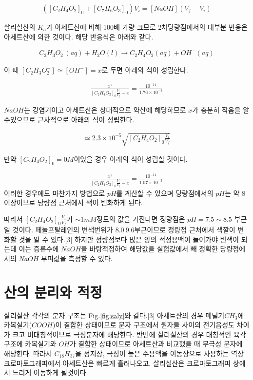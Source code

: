 \documentclass[%
 reprint,
 amsmath,amssymb,
 aps,
]{revtex4-2}
\begin{document}
\begin{align}
	([C_{2}H_{4}O_{2}]_{0}+[C_{7}H_{6}O_{3}]_{0})V_{i} = [NaOH](V_{f}-V_{i})
\end{align}

살리실산의 $K_{a}$가 아세트산에 비해 100배 가량 크므로 2차당량점에서의 대부분 반응은 아세트산에 의한 것이다. 해당 반응식은 아래와 같다.

\begin{align}
	C_{2}H_{3}O_{2}^{-}(aq) + H_{2}O(l) \rightarrow C_{2}H_{4}O_{2}(aq)+ OH^{-}(aq)
\end{align}

이 때 $[C_{2}H_{3}O_{2}^{-}] \simeq [OH^{-}] = x$로 두면 아래의 식이 성립한다.

\begin{align}
	\frac{x^{2}}{[C_{2}H_{4}O_{2}]_{0}\frac{V_{i}}{V_{f}}-x} = \frac{10^{-14}}{1.76\times10^{-5}}
\end{align}

$NaOH$는 강염기이고 아세트산은 상대적으로 약산에 해당하므로 $x$가 충분히 작음을 알수있으므로 근사적으로 아래의 식이 성립한다.

\begin{align}
	[OH^{-}] \simeq 2.3\times10^{-5}\sqrt{[C_{2}H_{4}O_{2}]_{0}\frac{V_{i}}{V_{f}}}
\end{align}

만약 $[C_{2}H_{4}O_{2}]_{0} = 0M$이었을 경우 아래의 식이 성립할 것이다.

\begin{align}
	\frac{x^{2}}{[C_{2}H_{4}O_{2}]_{0}\frac{V_{i}}{V_{f}}-x} = \frac{10^{-14}}{1.07\times10^{-3}}
\end{align}
이러한 경우에도 마찬가지 방법으로 $pH$를 계산할 수 있으며 당량점에서의 $pH$는 약 $8$이상이므로 당량점 근처에서 색이 변화하게 된다.

따라서 $[C_{2}H_{4}O_{2}]_{0}\frac{V_{i}}{V_{f}}$가 $\sim 1mM$정도의 값을 가진다면 정량점은 $pH = 7.5\sim8.5$ 부근일 것이다. 페놀프탈레인의 변색번위가 $8.0~9.6$부근이므로 정량점 근처에서 색깔이 변화할 것을 알 수 있다.[3] 하지만 정량점보다 많은 양의 적정용액이 들어가야 변색이 되는데 이는 증류수에 $NaOH$을 바탕적정하여 해당값을 실험값에서 빼 정확한 당량점에서의 $NaOH$ 부피값을 측정할 수 있다.

\section{\label{sec:level2}산의 분리와 적정}
살리실산 각각의 분자 구조는 Fig.\ref{fig:saly}와 같다.[3] 아세트산의 경우 메틸기$CH_{3}$에 카복실기($COOH$)이 결합한 상태이므로 분자 구조에서 원자들 사이의 전기음성도 차이가 크고 비대칭적이므로 극성분자에 해당한다. 반면에 살리실산의 경우 대칭적인 육각구조에 카복실기와 $OH$가 결합한 상태이므로 아세트산과 비교했을 때 무극성 분자에 해당한다. 따라서 $C_{18}H_{37}$을 정지상, 극성이 높은 수용액을 이동상으로 사용하는 역상크로마토그래피에서 아세트산은 빠르게 흘러나오고, 살리실산은 크로마토그래피 상에서 느리게 이동하게 될것이다.
\end{document}
